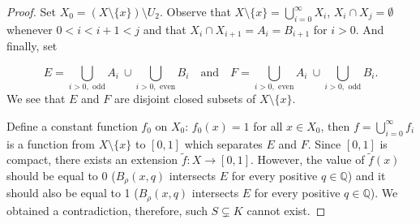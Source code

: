 \begin{proof}
    Set $X_0 = (X\setminus \{x\})\setminus U_2$. Observe that $X\setminus \{x\} = \bigcup_{i=0}^\infty X_i$, $X_i\cap X_j = \emptyset$ whenever $0<i<i+1<j$ and that $X_i\cap X_{i+1} = A_i = B_{i+1}$ for $i>0$.
    And finally, set

    $$ E = \bigcup_{i>0, \text{ odd}} A_i ~\cup \bigcup_{i>0, \text{ even}} B_i\quad\text{and}\quad F = \bigcup_{i>0, \text{ even}} A_i ~\cup \bigcup_{i>0, \text{ odd}} B_i. $$
    We see that $E$ and $F$ are disjoint closed subsets of $X\setminus \{x\}$.

    Define a constant function $f_0$ on $X_0$: $f_0(x) = 1$ for all $x\in X_0$, then $ f = \bigcup_{i=0}^{\infty} f_i $ is a function from $X\setminus \{x\}$ to $[0,1]$ which separates $E$ and $F$. Since $[0,1]$ is compact, there exists an extension $\tilde f\colon X \to [0,1]$. However, the value of $\tilde f(x)$ should be equal to 0 ($B_\rho(x,q)$ intersects $E$ for every positive $q\in \mathbb Q$) and it should also be equal to 1 ($B_\rho(x,q)$ intersects $E$ for every positive $q\in \mathbb Q$). We obtained a contradiction, therefore, such $S\subsetneq K$ cannot exist.
\end{proof}
